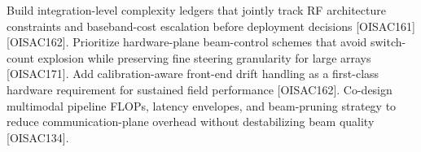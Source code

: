 {}
\markdownRendererSectionEnd \markdownRendererSectionBegin
{}\markdownRendererInterblockSeparator
{}\markdownRendererUlBeginTight
\markdownRendererUlItem Build integration-level complexity ledgers that jointly track RF architecture constraints and baseband-cost escalation before deployment decisions [O\markdownRendererUnderscore{}ISAC\markdownRendererUnderscore{}161][O\markdownRendererUnderscore{}ISAC\markdownRendererUnderscore{}162].\markdownRendererUlItemEnd 
\markdownRendererUlItem Prioritize hardware-plane beam-control schemes that avoid switch-count explosion while preserving fine steering granularity for large arrays [O\markdownRendererUnderscore{}ISAC\markdownRendererUnderscore{}171].\markdownRendererUlItemEnd 
\markdownRendererUlItem Add calibration-aware front-end drift handling as a first-class hardware requirement for sustained field performance [O\markdownRendererUnderscore{}ISAC\markdownRendererUnderscore{}162].\markdownRendererUlItemEnd 
\markdownRendererUlItem Co-design multimodal pipeline FLOPs, latency envelopes, and beam-pruning strategy to reduce communication-plane overhead without destabilizing beam quality [O\markdownRendererUnderscore{}ISAC\markdownRendererUnderscore{}134].\markdownRendererUlItemEnd 
\markdownRendererUlEndTight \markdownRendererInterblockSeparator
{}
\markdownRendererSectionEnd 
\markdownRendererSectionEnd \markdownRendererSectionBegin
{}\markdownRendererInterblockSeparator
{}\markdownRendererSectionBegin
{}\markdownRendererInterblockSeparator
